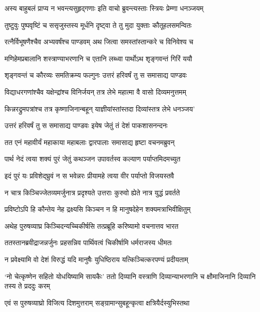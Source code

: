 \twolineshloka
{अस्य बाहुबलं प्राप्य न भवन्त्यसुहृद्गणाः}
{इति वाचो ब्रुवन्त्यस्ताः स्त्रियः प्रेम्णा धनञ्जयम्}


\twolineshloka
{तुष्टुवुः पुष्पवृष्टिं च ससृजुस्तस्य मूर्धनि}
{दृष्ट्वा ते तु मुदा युक्ताः कौतूहलसमन्वितः}


\twolineshloka
{रत्नैर्विभूषणैश्चैव अभ्यवर्षंश्च पाण्डवम्}
{अथ जित्वा समस्तांस्तान्करे च विनिवेश्य च}


\twolineshloka
{मणिहेमप्रबालानि शस्त्राण्याभरणानि च}
{एतानि लब्ध्वा पार्थोऽथ शृङ्गवन्तं गिरिं ययौ}


\twolineshloka
{शृङ्गवन्तं च कौरव्यः समतिक्रम्य फल्गुनः}
{उत्तरं हरिवर्षं तु स समासाद्य पाण्डवः}


\twolineshloka
{विद्याधरगणांश्चैव यक्षेन्द्रांश्च विनिर्जयन्}
{तत्र लेभे महात्मा वै वासो दिव्यमनुत्तमम्}


\twolineshloka
{किन्नरद्रुमपत्रांश्च तत्र कृष्णाजिनान्बहून्}
{याज्ञीयांस्तांस्तदा दिव्यांस्तत्र लेभे धनञ्जय'}


\twolineshloka
{उत्तरं हरिवर्षं तु स समासाद्य पाण्डवः}
{इयेष जेतुं तं देशं पाकशासनन्दनः}


\twolineshloka
{तत एनं महावीर्यं महाकाया महाबलाः}
{द्वारपालाः समासाद्य हृष्टा वचनमब्रुवन्}


\twolineshloka
{पार्थ नेदं त्वया शक्यं पुरं जेतुं कथञ्जन}
{उपावर्तस्व कल्याण पर्याप्तमिदमच्युत}


\twolineshloka
{इदं पुरं यः प्रविशेद्घ्रुवं न स भवेन्नरः}
{प्रीयामहे त्वया वीर पर्याप्तो विजयस्तवै}


\twolineshloka
{न चात्र किञ्चिज्जेतव्यमर्जुनात्र प्रदृश्यते}
{उत्तराः कुरुवो ह्येते नात्र युद्धं प्रवर्तते}


\twolineshloka
{प्रविष्टोऽपि हि कौन्तेय नेह द्रक्ष्यसि किञ्चन}
{न हि मानुषदेहेन शक्यमत्राभिवीक्षितुम्}


\twolineshloka
{अथेह पुरुषव्याघ्र किञ्चिदन्यच्चिकीर्षसि}
{तत्प्रब्रूहि करिष्यामो वचनात्तव भारत}


\twolineshloka
{ततस्तानब्रवीद्राजन्नर्जुनः प्रहसन्निव}
{पार्थिवत्वं चिकीर्षामि धर्मराजस्य धीमतः}


\twolineshloka
{न प्रवेक्ष्यामि वो देशं विरुद्धं यदि मानुषैः}
{युधिष्ठिराय यत्किञ्चित्करपण्यं प्रदीयताम्}


\threelineshloka
{`नो चेत्कृष्णेन सहितो योधयिष्यामि सायकैः'}
{ततो दिव्यानि वस्त्राणि दिव्यान्याभरणानि च}
{क्षौमाजिनानि दिव्यानि तस्य ते प्रददुः करम्}


\twolineshloka
{एवं स पुरुषव्याघ्रो विजित्य दिशमुत्तराम्}
{सङ्ग्रामान्सुबहून्कृत्वा क्षत्रियैर्दस्युभिस्तथा}


